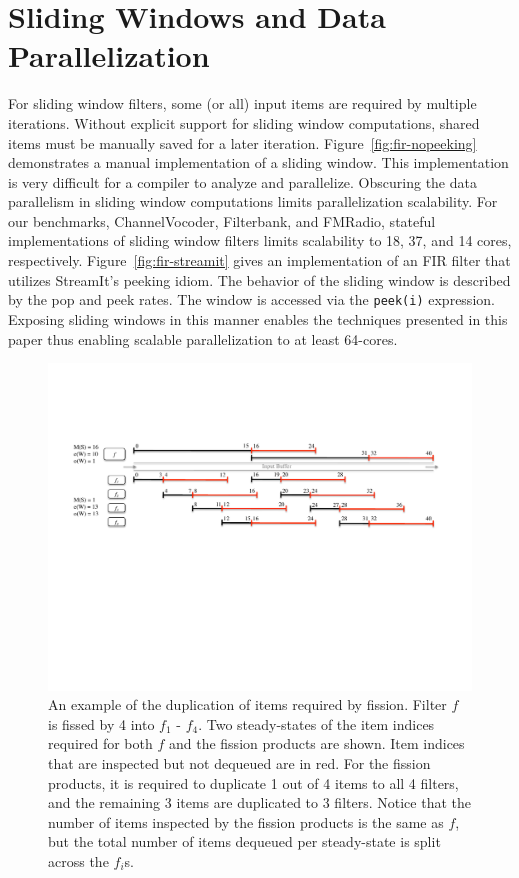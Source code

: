 \section{Sliding Windows and Data Parallelization}

For sliding window filters, some (or all) input items are required by
multiple iterations.  Without explicit support for sliding window
computations, shared items must be manually saved for a later
iteration.  Figure~\ref{fig:fir-nopeeking} demonstrates a manual
implementation of a sliding window.  This implementation is very
difficult for a compiler to analyze and parallelize.  Obscuring the
data parallelism in sliding window computations limits parallelization
scalability.  For our benchmarks, ChannelVocoder, Filterbank, and
FMRadio, stateful implementations of sliding window filters limits
scalability to 18, 37, and 14 cores, respectively.
Figure~\ref{fig:fir-streamit} gives an implementation of an FIR filter
that utilizes StreamIt's peeking idiom.  The behavior of the sliding
window is described by the pop and peek rates.  The window is accessed
via the {\tt peek(i)} expression.  Exposing sliding windows in this
manner enables the techniques presented in this paper thus enabling
scalable parallelization to at least 64-cores.

\begin{figure}[t]
\centering
\includegraphics[width=6.0in]{figures/fission-sharing.pdf}
\caption[An example of the sharing required by fission.]  { An
  example of the duplication of items required by fission.  Filter $f$
  is fissed by 4 into $f_1$ - $f_4$.  Two steady-states of the item
  indices required for both $f$ and the fission products are shown.
  Item indices that are inspected but not dequeued are in red.  For the
  fission products, it is required to duplicate 1 out of 4 items to
  all 4 filters, and the remaining 3 items are duplicated to 3
  filters.  Notice that the number of items inspected by the fission
  products is the same as $f$, but the total number of items dequeued 
per steady-state is split across the $f_i$s.
\label{fig:fission-sharing}}
\end{figure}

